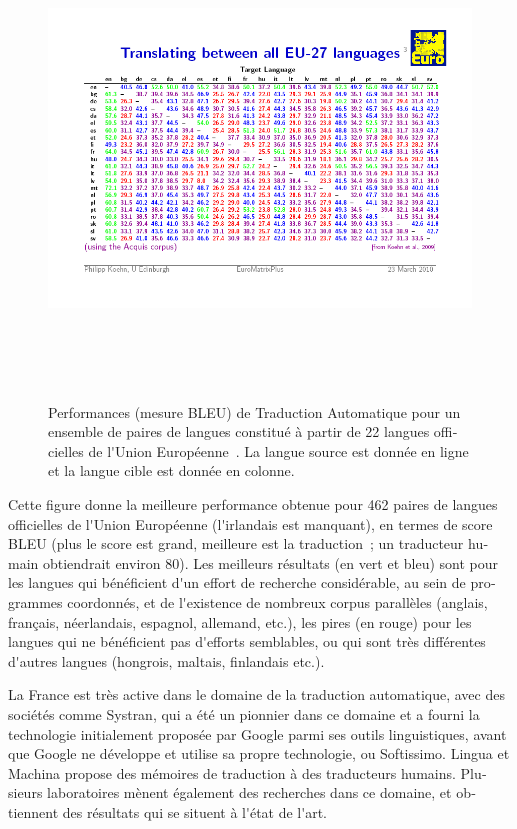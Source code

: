 \documentclass[]{../metanetpaper}
\begin{document}
\begin{french}
\begin{multicols}{2}
\begin{figure}[!ht]
\begin{center}
  \includegraphics[height=5.0in]{../_media/french/french_table1_mt_matrix.png}
  \caption{Performances (mesure BLEU) de Traduction Automatique pour un ensemble de paires de langues constitué à partir de 22 langues officielles de l{\mbox '}Union Européenne~\cite{mt462}. La langue source est donnée en ligne et la langue cible est donnée en colonne.}
  \label{fig:euromatrixplus}
\end{center}
\end{figure}

Cette figure donne la meilleure performance obtenue pour 462 paires de
langues officielles de l{\mbox '}Union Européenne (l{\mbox '}irlandais est manquant),
en termes de score BLEU (plus le score est grand, meilleure est la
traduction~; un traducteur humain obtiendrait environ 80). Les
meilleurs résultats (en vert et bleu) sont pour les langues qui
bénéficient d{\mbox '}un effort de recherche considérable, au sein de
programmes coordonnés, et de l{\mbox '}existence de nombreux corpus parallèles
(anglais, français, néerlandais, espagnol, allemand, etc.), les pires
(en rouge) pour les langues qui ne bénéficient pas d{\mbox '}efforts
semblables, ou qui sont très différentes d{\mbox '}autres langues (hongrois,
maltais, finlandais etc.).

La France est très active dans le domaine de la traduction
automatique, avec des sociétés comme Systran, qui a été un pionnier
dans ce domaine et a fourni la technologie initialement proposée par
Google parmi ses outils linguistiques, avant que Google ne développe
et utilise sa propre technologie, ou Softissimo. Lingua et Machina
propose des mémoires de traduction à des traducteurs
humains. Plusieurs laboratoires mènent également des recherches dans
ce domaine, et obtiennent des résultats qui se situent à l{\mbox '}état de
l{\mbox '}art.\\


\end{multicols}
\end{french}
\end{document}
